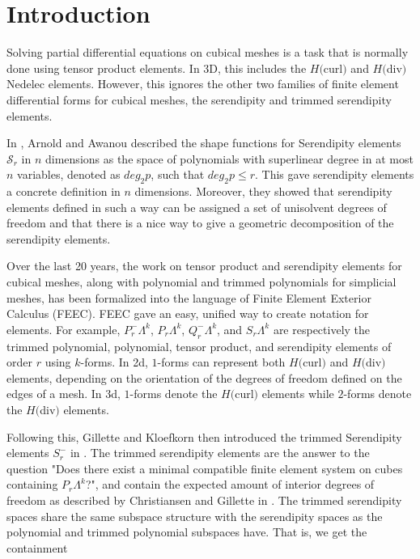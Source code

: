 \documentclass[manuscript,screen]{acmart}
\begin{document}
  
  \section{Introduction}
  
  Solving partial differential equations on cubical meshes is a task that is normally done using tensor product elements. In 3D, this includes the $H($curl$)$ and $H($div$)$ Nedelec elements. However, this ignores the other two families of finite element differential forms for cubical meshes, the serendipity and trimmed serendipity elements.
  
  In \cite{arnold2011serendipity}, Arnold and Awanou described the shape functions for Serendipity elements $\mathcal{S}_r$ in $n$ dimensions as the space of polynomials with superlinear degree in at most $n$ variables, denoted as $deg_2 p$, such that $deg_2 p \leq r$. This gave serendipity elements a concrete definition in $n$ dimensions. Moreover, they showed that serendipity elements defined in such a way can be assigned a set of unisolvent degrees of freedom and that there is a nice way to give a geometric decomposition of the serendipity elements.
  
  Over the last 20 years, the work on tensor product and serendipity elements for cubical meshes, along with polynomial and trimmed polynomials for simplicial meshes, has been formalized into the language of Finite Element Exterior Calculus (FEEC).  FEEC gave an easy, unified way to create notation for elements.  For example, $P^-_r \Lambda^k$, $P_r \Lambda^k$, $Q^-_r \Lambda^k$, and $S_r \Lambda^k$ are respectively the trimmed polynomial, polynomial, tensor product, and serendipity elements of order $r$ using $k$-forms.  In 2d, $1$-forms can represent both $H($curl$)$ and $H($div$)$ elements, depending on the orientation of the degrees of freedom defined on the edges of a mesh.  In 3d, $1$-forms denote the $H($curl$)$ elements while $2$-forms denote the $H($div$)$ elements.  
  
  Following this, Gillette and Kloefkorn then introduced the trimmed Serendipity elements $S^-_r$ in \cite{gillette2019trimmed}.  The trimmed serendipity elements are the answer to the question "Does there exist a minimal compatible finite element system on cubes containing $P_r \Lambda^k$?", and contain the expected amount of interior degrees of freedom as described by Christiansen and Gillette in \cite{christiansen2016constructions}.  The trimmed serendipity spaces share the same subspace structure with the serendipity spaces as the polynomial and trimmed polynomial subspaces have.  That is, we get the containment 
  
\end{document}
